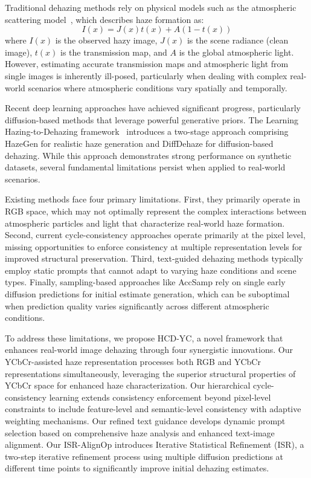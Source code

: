 \documentclass{article}
\begin{document}
Traditional dehazing methods rely on physical models such as the atmospheric scattering model~\cite{mccartney1976optics}, which describes haze formation as:
\begin{equation}
I(x) = J(x)t(x) + A(1-t(x))
\end{equation}
where $I(x)$ is the observed hazy image, $J(x)$ is the scene radiance (clean image), $t(x)$ is the transmission map, and $A$ is the global atmospheric light. However, estimating accurate transmission maps and atmospheric light from single images is inherently ill-posed, particularly when dealing with complex real-world scenarios where atmospheric conditions vary spatially and temporally.

Recent deep learning approaches have achieved significant progress, particularly diffusion-based methods that leverage powerful generative priors. The Learning Hazing-to-Dehazing framework~\cite{wang2025learning} introduces a two-stage approach comprising HazeGen for realistic haze generation and DiffDehaze for diffusion-based dehazing. While this approach demonstrates strong performance on synthetic datasets, several fundamental limitations persist when applied to real-world scenarios.

Existing methods face four primary limitations. First, they primarily operate in RGB space, which may not optimally represent the complex interactions between atmospheric particles and light that characterize real-world haze formation. Second, current cycle-consistency approaches operate primarily at the pixel level, missing opportunities to enforce consistency at multiple representation levels for improved structural preservation. Third, text-guided dehazing methods typically employ static prompts that cannot adapt to varying haze conditions and scene types. Finally, sampling-based approaches like AccSamp rely on single early diffusion predictions for initial estimate generation, which can be suboptimal when prediction quality varies significantly across different atmospheric conditions.

To address these limitations, we propose HCD-YC, a novel framework that enhances real-world image dehazing through four synergistic innovations. Our YCbCr-assisted haze representation processes both RGB and YCbCr representations simultaneously, leveraging the superior structural properties of YCbCr space for enhanced haze characterization. Our hierarchical cycle-consistency learning extends consistency enforcement beyond pixel-level constraints to include feature-level and semantic-level consistency with adaptive weighting mechanisms. Our refined text guidance develops dynamic prompt selection based on comprehensive haze analysis and enhanced text-image alignment. Our ISR-AlignOp introduces Iterative Statistical Refinement (ISR), a two-step iterative refinement process using multiple diffusion predictions at different time points to significantly improve initial dehazing estimates.
\end{document}
